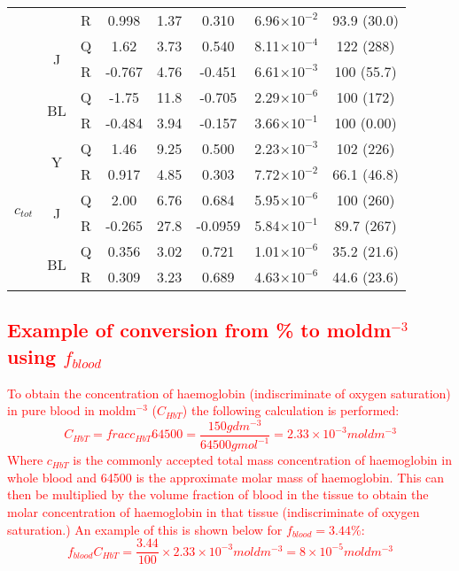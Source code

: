 \begin{subappendices}
\begin{table}[htb!]
\begin{tabular}{|ccc|ccccc|}
        & & R & 0.998 & 1.37 & 0.310 & 6.96$\times 10^{-2}$ & 93.9 (30.0) \\
        \cline{2-8}
        & \multirow{2}{*}{J} & Q & 1.62 & 3.73 & 0.540 & 8.11$\times 10^{-4}$ & 122 (288) \\
        & & R & -0.767 & 4.76 & -0.451 & 6.61$\times 10^{-3}$ & 100 (55.7) \\
        \cline{2-8}
        & \multirow{2}{*}{BL} & Q & -1.75 & 11.8 & -0.705 & 2.29$\times 10^{-6}$ & 100 (172) \\
        & & R & -0.484 & 3.94 & -0.157 & 3.66$\times 10^{-1}$ & 100 (0.00) \\
        \hline
        \multirow{6}{*}{$c_{tot}$} & \multirow{2}{*}{Y} & Q & 1.46 & 9.25 & 0.500 & 2.23$\times 10^{-3}$ & 102 (226) \\
        & & R & 0.917 & 4.85 & 0.303 & 7.72$\times 10^{-2}$ & 66.1 (46.8) \\
        \cline{2-8}
        & \multirow{2}{*}{J} & Q & 2.00 & 6.76 & 0.684 & 5.95$\times 10^{-6}$ & 100 (260) \\
        & & R & -0.265 & 27.8 & -0.0959 & 5.84$\times 10^{-1}$ & 89.7 (267) \\
        \cline{2-8}
        & \multirow{2}{*}{BL} & Q & 0.356 & 3.02 & 0.721 & 1.01$\times 10^{-6}$ & 35.2 (21.6) \\
        & & R & 0.309 & 3.23 & 0.689 & 4.63$\times 10^{-6}$ & 44.6 (23.6) \\
        \hline
    \end{tabular}
    \label{tb:phantomparamsfull}
\end{table}

\textcolor{red}{\subsection{Example of conversion from \% to moldm$^{-3}$ using $f_{blood}$}\label{ap:phantomcalc}
To obtain the concentration of haemoglobin (indiscriminate of oxygen saturation) in pure blood in moldm$^{-3}$ ($C_{HbT}$) the following calculation is performed: 
\begin{equation}
    C_{HbT} = frac{c_{HbT}}{64500} = \frac{150gdm^{-3}}{64500gmol^{-1}} = 2.33\times10^{-3}moldm^{-3}
\end{equation}
Where $c_{HbT}$ is the commonly accepted total mass concentration of haemoglobin in whole blood and 64500 is the approximate molar mass of haemoglobin.
This can then be multiplied by the volume fraction of blood in the tissue to obtain the molar concentration of haemoglobin in that tissue (indiscriminate of oxygen saturation.) An example of this is shown below for $f_{blood}=3.44\%$: 
\begin{equation}
    f_{blood}C_{HbT} = \frac{3.44}{100} \times 2.33\times10^{-3}moldm^{-3} = 8\times10^{-5}moldm^{-3}
\end{equation}
}
\FloatBarrier
\end{subappendices}
